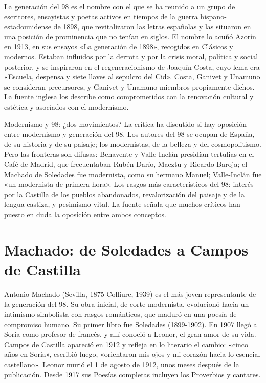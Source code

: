 \documentclass{book}
\begin{document}
La generación del 98 es el nombre con el que se ha reunido a un grupo de escritores, ensayistas y poetas activos en tiempos de la guerra hispano-estadounidense de 1898, que revitalizaron las letras españolas y las situaron en una posición de prominencia que no tenían en siglos. El nombre lo acuñó Azorín en 1913, en sus ensayos «La generación de 1898», recogidos en Clásicos y modernos. Estaban influidos por la derrota y por la crisis moral, política y social posterior, y se inspiraron en el regeneracionismo de Joaquín Costa, cuyo lema era «Escuela, despensa y siete llaves al sepulcro del Cid». Costa, Ganivet y Unamuno se consideran precursores, y Ganivet y Unamuno miembros propiamente dichos. La fuente inglesa los describe como comprometidos con la renovación cultural y estética y asociados con el modernismo.


Modernismo y 98: ¿dos movimientos?
La crítica ha discutido si hay oposición entre modernismo y generación del 98. Los autores del 98 se ocupan de España, de su historia y de su paisaje; los modernistas, de la belleza y del cosmopolitismo. Pero las fronteras son difusas: Benavente y Valle-Inclán presidían tertulias en el Café de Madrid, que frecuentaban Rubén Darío, Maeztu y Ricardo Baroja; el Machado de Soledades fue modernista, como su hermano Manuel; Valle-Inclán fue «un modernista de primera hora». Los rasgos más característicos del 98: interés por la Castilla de los pueblos abandonados, revalorización del paisaje y de la lengua castiza, y pesimismo vital. La fuente señala que muchos críticos han puesto en duda la oposición entre ambos conceptos.


\section{Machado: de Soledades a Campos de Castilla}

Antonio Machado (Sevilla, 1875-Colliure, 1939) es el más joven representante de la generación del 98. Su obra inicial, de corte modernista, evolucionó hacia un intimismo simbolista con rasgos románticos, que maduró en una poesía de compromiso humano. Su primer libro fue Soledades (1899-1902). En 1907 llegó a Soria como profesor de francés, y allí conoció a Leonor, el gran amor de su vida. Campos de Castilla apareció en 1912 y refleja en lo literario el cambio: «cinco años en Soria», escribió luego, «orientaron mis ojos y mi corazón hacia lo esencial castellano». Leonor murió el 1 de agosto de 1912, unos meses después de la publicación. Desde 1917 sus Poesías completas incluyen los Proverbios y cantares.
\end{document}
